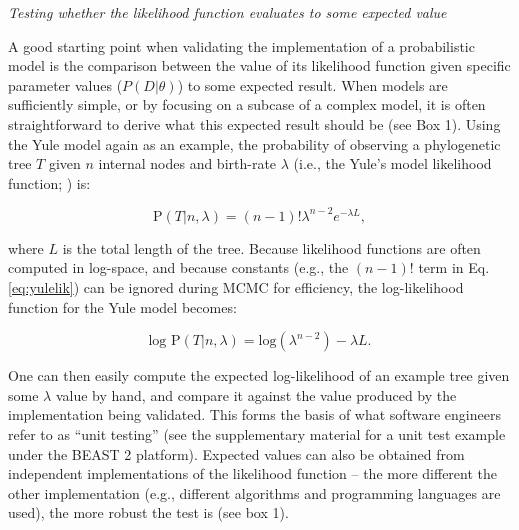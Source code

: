 \documentclass[oneside]{article}
\begin{document}


\noindent \emph{Testing whether the likelihood function evaluates to some
  expected value}

A good starting point when validating the implementation of a probabilistic
model is the comparison between the value of its likelihood function given
specific parameter values ($P(D|\theta)$) to some expected result.
When models are sufficiently simple, or by focusing
on a subcase of a complex model, it is often straightforward to derive
what this expected result should be (see Box 1).
Using the Yule model again as an example, the probability of observing
a phylogenetic tree $T$ given $n$ internal nodes and birth-rate
$\lambda$ (i.e., the Yule's model likelihood function;
\citealp{nee01}) is:

\begin{equation}
  \text{P}(T|n,\lambda) = (n-1)!\lambda^{n-2}e^{-\lambda L},
  \label{eq:yulelik}
\end{equation}

\noindent where $L$ is the total length of the tree.
Because likelihood functions are often computed in log-space, and
because constants (e.g., the $(n-1)!$ term in Eq. \ref{eq:yulelik}) can be
ignored during MCMC for efficiency, the log-likelihood function for the Yule model
becomes:

\begin{equation}
\text{log P}(T|n,\lambda) = \text{log}(\lambda^{n-2}) - \lambda L.
\end{equation}

\noindent One can then easily compute the expected log-likelihood of an example
tree given some $\lambda$ value by hand, and compare it against the
value produced by the implementation being validated.
This forms the basis of what software engineers refer to as ``unit
testing'' (see the supplementary material for a unit test example
under the BEAST 2 platform).
Expected values can also be obtained from independent
implementations of the likelihood function -- the more different the
other implementation (e.g., different algorithms and programming
languages are used), the more robust the test is (see box 1).
\end{document}
